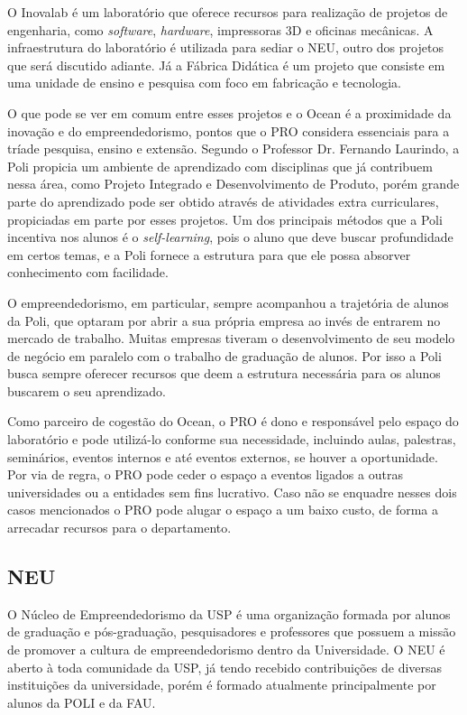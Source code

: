 O Inovalab é um laboratório que oferece recursos para realização de projetos de engenharia, como \textit{software}, \textit{hardware}, impressoras 3D e oficinas mecânicas. A infraestrutura do laboratório é utilizada para sediar o NEU, outro dos projetos que será discutido adiante. Já a Fábrica Didática é um projeto que consiste em uma unidade de ensino e pesquisa com foco em fabricação e tecnologia.

O que pode se ver em comum entre esses projetos e o Ocean é a proximidade da inovação e do empreendedorismo, pontos que o PRO considera essenciais para a tríade pesquisa, ensino e extensão. Segundo o Professor Dr. Fernando Laurindo, a Poli propicia um ambiente de aprendizado com disciplinas que já contribuem nessa área, como Projeto Integrado e Desenvolvimento de Produto, porém grande parte do aprendizado pode ser obtido através de atividades extra curriculares, propiciadas em parte por esses projetos. Um dos principais métodos que a Poli incentiva nos alunos é o \textit{self-learning}, pois o aluno que deve buscar profundidade em certos temas, e a Poli fornece a estrutura para que ele possa absorver conhecimento com facilidade.

O empreendedorismo, em particular, sempre acompanhou a trajetória de alunos da Poli, que optaram por abrir a sua própria empresa ao invés de entrarem no mercado de trabalho. Muitas empresas tiveram o desenvolvimento de seu modelo de negócio em paralelo com o trabalho de graduação de alunos. Por isso a Poli busca sempre oferecer recursos que deem a estrutura necessária para os alunos buscarem o seu aprendizado.

Como parceiro de cogestão do Ocean, o PRO é dono e responsável pelo espaço do laboratório e pode utilizá-lo conforme sua necessidade, incluindo aulas, palestras, seminários, eventos internos e até eventos externos, se houver a oportunidade. Por via de regra, o PRO pode ceder o espaço a eventos ligados a outras universidades ou a entidades sem fins lucrativo. Caso não se enquadre nesses dois casos mencionados o PRO pode alugar o espaço a um baixo custo, de forma a arrecadar recursos para o departamento.

\subsection{NEU}
\label{sec:con_neu}

O Núcleo de Empreendedorismo da USP é uma organização formada por alunos de graduação e pós-graduação, pesquisadores e professores que possuem a missão de promover a cultura de empreendedorismo dentro da Universidade. O NEU é aberto à toda comunidade da USP, já tendo recebido contribuições de diversas instituições da universidade, porém é formado atualmente principalmente por alunos da POLI e da FAU.

